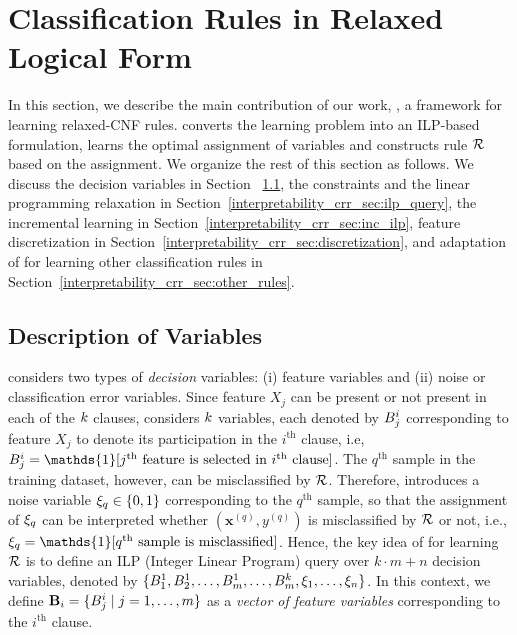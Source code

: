 \section{Classification Rules in Relaxed Logical Form}
\label{interpretability_crr_sec:ilp}
In this section, we describe the main contribution of our work, {\crr}, a  framework for learning   relaxed-CNF rules.  {\crr}  converts the learning problem into  an ILP-based formulation,  learns the optimal assignment of variables and constructs rule $ {\mathcal{R}} $ based on the assignment. We organize the rest of this section as follows.
We  discuss the decision variables in Section ~\ref{interpretability_crr_sec:variables},  the constraints and the linear programming relaxation in Section~\ref{interpretability_crr_sec:ilp_query}, the incremental learning in Section~\ref{interpretability_crr_sec:inc_ilp}, feature discretization in Section~\ref{interpretability_crr_sec:discretization}, and adaptation of {\crr} for learning other classification rules in Section~\ref{interpretability_crr_sec:other_rules}.




\subsection{Description of Variables}
\label{interpretability_crr_sec:variables}
{\crr} considers two types of  \emph{decision} variables: (i) feature variables and (ii) noise or classification error variables.
Since  feature $ X_j $ can be present or not present  in each of  the  $ k $ clauses, {\crr} considers $ k $   variables, each denoted by $ B^i_j  $  corresponding to   feature $ X_j $  to denote its participation  in the $ i^\text{th} $ clause, i.e, $ \bool^i_j=\mathds{1}[j^\text{th}\text{ feature is selected in }i^\text{th}\text{ clause}]  $.  The $ q^\text{th} $ sample in the training dataset, however, can be misclassified by $ {\mathcal{R}} $.  Therefore, {\crr}  introduces  a noise variable $ \xi_q \in \{0,1\}  $  corresponding to the $ q^\text{th} $ sample, so that the assignment of $ \xi_q  $ can be interpreted whether $ (\mathbf{x}^{(q)}, y^{(q)}) $ is misclassified by $ {\mathcal{R}} $ or not, i.e., $ \noise_q=\mathds{1}[q^\text{th}\text{ sample is misclassified}] $.  Hence, the key idea of {{\crr}} for learning $ {\mathcal{R}} $ is to define an ILP (Integer Linear Program) query over $k \cdot m + n$  decision variables, denoted by $\{ B_{1}^{1}, B_{2}^{1}, \dots ,B_{m}^{1}, \dots ,B_{m}^{k}, \xi_1, \dots ,\xi_n\}$.   In this context, we define $\mathbf{B}_i = \{B^i_{j} \mid j= 1,\dots,m\}$ as a \emph{vector of   feature variables} corresponding to the $ i^\text{th} $ clause.


